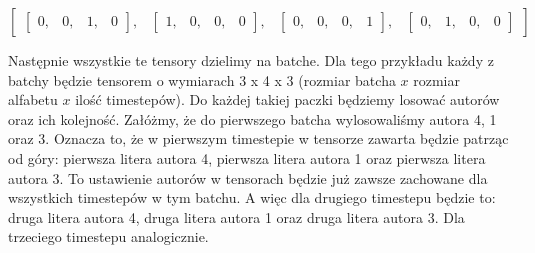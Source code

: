 $
\begin{bmatrix} \begin{bmatrix} 0, & 0, & 1, & 0\end{bmatrix},  & \begin{bmatrix} 1, & 0, & 0, & 0\end{bmatrix}, & \begin{bmatrix} 0, & 0, & 0, & 1\end{bmatrix}, & \begin{bmatrix} 0, & 1, & 0, & 0\end{bmatrix} \end{bmatrix}
$

Następnie wszystkie te tensory dzielimy na batche.
Dla tego przykładu każdy z batchy będzie tensorem o wymiarach 3 x 4 x 3 (rozmiar batcha $x$ rozmiar 
alfabetu $x$ ilość timestepów).
Do każdej takiej paczki będziemy losować autorów oraz ich kolejność. Załóżmy, że do pierwszego batcha
wylosowaliśmy autora 4, 1 oraz 3. Oznacza to, że w pierwszym timestepie w tensorze zawarta będzie 
patrząc od góry: pierwsza litera autora 4, pierwsza litera autora 1 oraz pierwsza litera autora 3.
To ustawienie autorów w tensorach będzie już zawsze zachowane dla wszystkich timestepów w tym batchu. 
A więc dla drugiego timestepu będzie to: druga litera autora 4, druga litera autora 1 oraz druga 
litera autora 3. Dla trzeciego timestepu analogicznie. 
\newline
\vspace{3mm}
